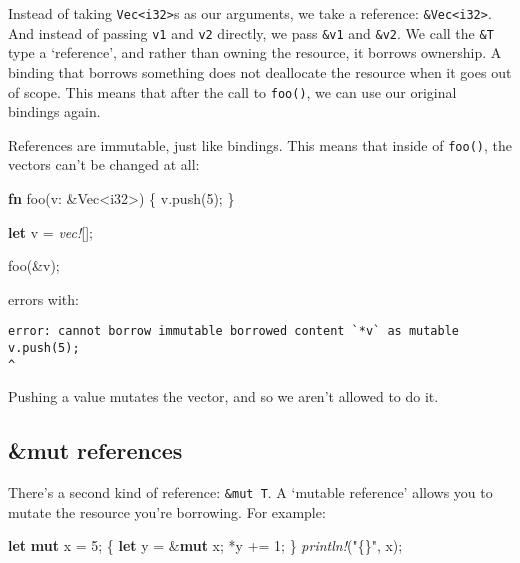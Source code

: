 \documentclass[a4paper,]{book}
\newenvironment{Shaded}{\begin{snugshade}}{\end{snugshade}}
\newcommand{\KeywordTok}[1]{\textcolor[rgb]{0.13,0.29,0.53}{\textbf{{#1}}}}
\newcommand{\DataTypeTok}[1]{\textcolor[rgb]{0.13,0.29,0.53}{{#1}}}
\newcommand{\DecValTok}[1]{\textcolor[rgb]{0.00,0.00,0.81}{{#1}}}
\newcommand{\StringTok}[1]{\textcolor[rgb]{0.31,0.60,0.02}{{#1}}}
\newcommand{\PreprocessorTok}[1]{\textcolor[rgb]{0.56,0.35,0.01}{\textit{{#1}}}}
\newcommand{\NormalTok}[1]{{#1}}
\begin{document}
Instead of taking \texttt{Vec\textless{}i32\textgreater{}}s as our
arguments, we take a reference:
\texttt{\&Vec\textless{}i32\textgreater{}}. And instead of passing
\texttt{v1} and \texttt{v2} directly, we pass \texttt{\&v1} and
\texttt{\&v2}. We call the \texttt{\&T} type a `reference', and rather
than owning the resource, it borrows ownership. A binding that borrows
something does not deallocate the resource when it goes out of scope.
This means that after the call to \texttt{foo()}, we can use our
original bindings again.

References are immutable, just like bindings. This means that inside of
\texttt{foo()}, the vectors can't be changed at all:

\begin{Shaded}
\begin{Highlighting}[]
\KeywordTok{fn} \NormalTok{foo(v: &}\DataTypeTok{Vec}\NormalTok{<}\DataTypeTok{i32}\NormalTok{>) \{}
     \NormalTok{v.push(}\DecValTok{5}\NormalTok{);}
\NormalTok{\}}

\KeywordTok{let} \NormalTok{v = }\PreprocessorTok{vec!}\NormalTok{[];}

\NormalTok{foo(&v);}
\end{Highlighting}
\end{Shaded}

errors with:

\begin{verbatim}
error: cannot borrow immutable borrowed content `*v` as mutable
v.push(5);
^
\end{verbatim}

Pushing a value mutates the vector, and so we aren't allowed to do it.

\subsection{\&mut references}\label{mut-references}

There's a second kind of reference: \texttt{\&mut\ T}. A `mutable
reference' allows you to mutate the resource you're borrowing. For
example:

\begin{Shaded}
\begin{Highlighting}[]
\KeywordTok{let} \KeywordTok{mut} \NormalTok{x = }\DecValTok{5}\NormalTok{;}
\NormalTok{\{}
    \KeywordTok{let} \NormalTok{y = &}\KeywordTok{mut} \NormalTok{x;}
    \NormalTok{*y += }\DecValTok{1}\NormalTok{;}
\NormalTok{\}}
\PreprocessorTok{println!}\NormalTok{(}\StringTok{"\{\}"}\NormalTok{, x);}
\end{Highlighting}
\end{Shaded}
\end{document}
